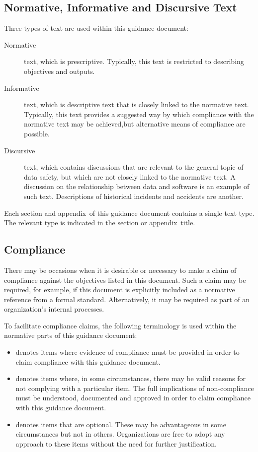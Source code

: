 \subsection{Normative, Informative and Discursive Text}
Three types of text are used within this guidance document:
\begin{description}
	\item[Normative] text, which is prescriptive. Typically, this text is restricted to describing objectives and outputs.
	\item[Informative] text, which is descriptive text that is closely linked to the normative text. Typically, this text provides a suggested way by which compliance with the normative text may be achieved\cbstart,but alternative means of compliance are possible\cbend.
	\item[Discursive] text, which contains discussions that are relevant to the general topic of data safety, but which are not closely linked to the normative text. A discussion on the relationship between data and software is an example of such text. Descriptions of historical incidents and accidents are another.
\end{description}

Each section \cbstart and appendix\cbend\ of this guidance document contains a single text type. The relevant type is indicated in the section \cbstart or appendix\cbend\ title.

\subsection{Compliance}
There may be occasions when it is desirable or necessary to make a claim of compliance against the objectives listed in this document. Such a claim may be required, for example, if this document is explicitly included as a normative reference from a formal standard. Alternatively, it may be required as part of an organization's internal processes.

To facilitate compliance claims, the following terminology is used within the normative parts of this guidance document:
\begin{itemize}
	\item {} denotes items where evidence of compliance must be provided in order to claim compliance with this guidance document.
	\item {} denotes items where, in some circumstances, there may be valid reasons for not complying with a particular item. The full implications of non-compliance must be understood, documented and approved in order to claim compliance with this guidance document.
	\item {} denotes items that are optional. These may be advantageous in some circumstances but not in others. Organizations are free to adopt any approach to these items without the need for further justification.
\end{itemize}
